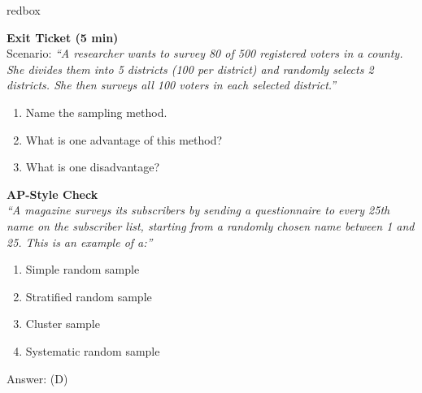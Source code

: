 \documentclass[10pt]{article}
\begin{document}
\begin{skillbox}{redbox}
\begin{minipage}[t]{0.48\linewidth}
    \textbf{Exit Ticket (5 min)}\\
    Scenario: \textit{``A researcher wants to survey 80 of 500 registered voters in
    a county. She divides them into 5 districts (100 per district) and randomly
    selects 2 districts. She then surveys all 100 voters in each selected
    district.''}
    \begin{enumerate}
        \item Name the sampling method.
        \item What is one advantage of this method?
        \item What is one disadvantage?
    \end{enumerate}
\end{minipage}
\hfill
\begin{minipage}[t]{0.48\linewidth}
    \textbf{AP-Style Check}\\
    \textit{``A magazine surveys its subscribers by sending a questionnaire to every
    25th name on the subscriber list, starting from a randomly chosen name between 1
    and 25. This is an example of a:''}
    \begin{enumerate}[label=(\Alph*)]
        \item Simple random sample
        \item Stratified random sample
        \item Cluster sample
        \item Systematic random sample
    \end{enumerate}
    Answer: (D)
\end{minipage}
\end{skillbox}
\end{document}

